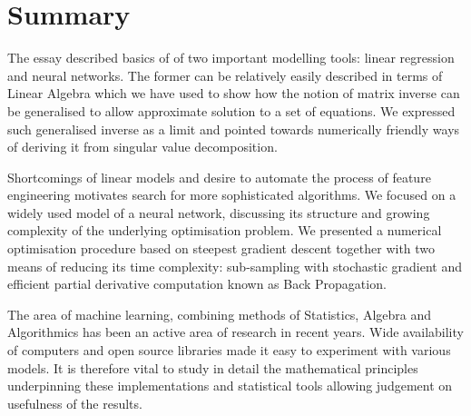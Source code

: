 \documentclass[a4paper,11pt]{article}
\theoremstyle{break}
\begin{document}
\section{Summary}
The essay described basics of of two important modelling tools: linear regression and neural networks.
The former can be relatively easily described in terms of Linear Algebra which we have used to show how the notion of matrix inverse can be generalised to allow approximate solution to a set of equations.
We expressed such generalised inverse as a limit and pointed towards numerically friendly ways of deriving it from singular value decomposition.

Shortcomings of linear models and desire to automate the process of feature engineering motivates search for more sophisticated algorithms.
We focused on a widely used model of a neural network, discussing its structure and growing complexity of the underlying optimisation problem.
We presented a numerical optimisation procedure based on steepest gradient descent together with two means of reducing its time complexity: sub-sampling with stochastic gradient and efficient partial derivative computation known as Back Propagation.

The area of machine learning,  combining methods of Statistics, Algebra and Algorithmics has been an active area of research in recent years.
Wide availability of computers and open source libraries made it easy to experiment with various models.
It is therefore vital to study in detail the mathematical principles underpinning these implementations and statistical tools allowing judgement on usefulness of the results.

\printbibliography

\tableofcontents
\end{document}

